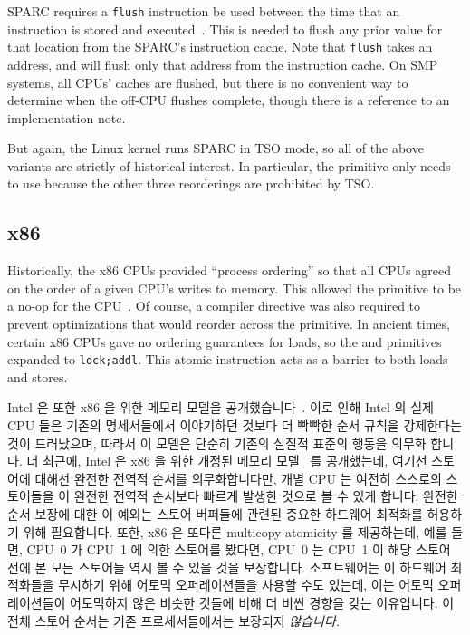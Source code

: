 SPARC requires a {\tt flush} instruction be used between the time that
an instruction is stored and executed~\cite{SPARC94}.
This is needed to flush any prior value for that location from
the SPARC's instruction cache.
Note that {\tt flush} takes an address, and will flush only that address
from the instruction cache.
On SMP systems, all CPUs' caches are flushed, but there is no
convenient way to determine when the off-CPU flushes complete,
though there is a reference to an implementation note.
\fi

But again, the Linux kernel runs SPARC in TSO mode, so
all of the above  variants are strictly of historical
interest.
In particular, the  primitive only needs to use 
because the other three reorderings are prohibited by TSO.

\subsection{x86}

Historically, the x86 CPUs provided ``process ordering'' so that all CPUs
agreed on the order of a given CPU's writes to memory.
This allowed the 
primitive to be a no-op for the CPU~\cite{IntelXeonV3-96a}.
Of course, a compiler directive was also required to prevent optimizations
that would reorder across the  primitive.
In ancient times, certain x86 CPUs gave no ordering guarantees for loads, so
the  and  primitives expanded to {\tt lock;addl}.
This atomic instruction acts as a barrier to both loads and stores.
\fi

Intel 은 또한 x86 을 위한 메모리 모델을
공개했습니다~\cite{Intelx86MemoryOrdering2007}.
이로 인해 Intel 의 실제 CPU 들은 기존의 명세서들에서 이야기하던 것보다 더
빡빡한 순서 규칙을 강제한다는 것이 드러났으며, 따라서 이 모델은 단순히 기존의
실질적 표준의 행동을 의무화 합니다.
더 최근에, Intel 은 x86 을 위한 개정된 메모리 모델~\cite[Section
8.2]{Intel64IA32v3A2011} 를 공개했는데, 여기선 스토어에 대해선 완전한 전역적
순서를 의무화합니다만, 개별 CPU 는 여전히 스스로의 스토어들을 이 완전한 전역적
순서보다 빠르게 발생한 것으로 볼 수 있게 합니다.
완전한 순서 보장에 대한 이 예외는 스토어 버퍼들에 관련된 중요한 하드웨어
최적화를 허용하기 위해 필요합니다.
또한, x86 은 또다른 multicopy atomicity 를 제공하는데, 예를 들면, CPU~0 가
CPU~1 에 의한 스토어를 봤다면, CPU~0 는 CPU~1 이 해당 스토어 전에 본 모든
스토어들 역시 볼 수 있을 것을 보장합니다.
소프트웨어는 이 하드웨어 최적화들을 무시하기 위해 어토믹 오퍼레이션들을 사용할
수도 있는데, 이는 어토믹 오퍼레이션들이 어토믹하지 않은 비슷한 것들에 비해 더
비싼 경향을 갖는 이유입니다.
이 전체 스토어 순서는 기존 프로세서들에서는 보장되지 \emph{않습니다}.
\iffalse

